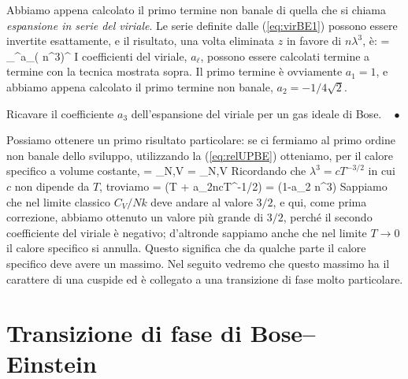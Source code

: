 Abbiamo appena calcolato il primo termine non banale di quella che si chiama {\em espansione in serie del viriale}. Le serie definite dalle (\ref{eq:virBE1}) possono essere invertite esattamente, e il risultato, una volta eliminata $z$ in favore di $n\lambda^3$, è:
\be
\label{eq:virBEtot}
 = \sum_{}^\infty a_\ell \left( n\lambda^3\right)^{}
\ee
I coefficienti del viriale, $a_\ell$, possono essere calcolati termine a termine con la tecnica mostrata sopra. Il primo termine è ovviamente $a_1 = 1$, e abbiamo appena calcolato il primo termine non banale, $a_2 = -1/4\sqrt{2}$.
\begin{Exercise}[title={Terzo coefficiente}, label={ex:bosevir}]
Ricavare il coefficiente $a_3$ dell'espansione del viriale per un gas ideale di Bose.$\quad\bullet$
\end{Exercise}
Possiamo ottenere un primo risultato particolare: se ci fermiamo al primo ordine non banale dello sviluppo, utilizzando la (\ref{eq:relUPBE}) otteniamo, per il calore specifico a volume costante,
\be
{} = _{N,V} =
_{N,V}
\ee
Ricordando che $\lambda^3 = cT^{-3/2}$ in cui $c$ non dipende da $T$, troviamo
\be
{} = \left(T + a_2ncT^{-1/2}\right)
= \left(1-a_2 n\lambda^3\right)
\ee
Sappiamo che nel limite classico $C_V/Nk$ deve andare al valore $3/2$, e qui, come prima correzione, abbiamo ottenuto un valore più grande di $3/2$, perché il secondo coefficiente del viriale è negativo; d'altronde sappiamo anche che nel limite $T\to0$ il calore specifico si annulla. Questo significa che da qualche parte il calore specifico deve avere un massimo. Nel seguito vedremo che questo massimo ha il carattere di una cuspide ed è collegato a una transizione di fase molto particolare.

\section{Transizione di fase di Bose--Einstein}

